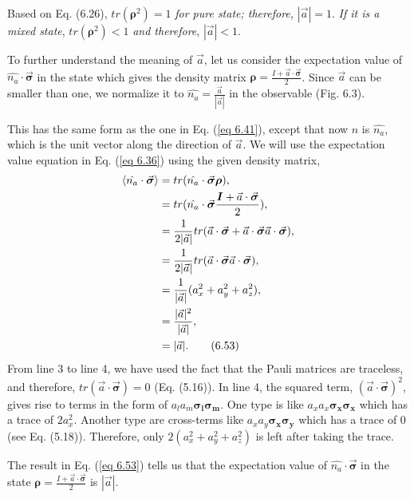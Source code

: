 \documentclass{article}
\begin{document}
Based on Eq. (6.26), $tr(\boldsymbol{\rho}^2)=1$ \textit{for pure state; therefore,} $|\vec{a}|=1$. 
\textit{If it is a mixed state}, $tr(\boldsymbol{\rho}^2)<1$ \textit{and therefore},
$|\vec{a}|<1$.

To further understand the meaning of $\vec{a}$, let us consider the
expectation value of $\hat{n_a}\cdot\vec{\boldsymbol{\sigma}}$ in the
state which gives the density matrix $\boldsymbol{\rho}=\frac{I+\vec{a}\cdot\vec{\boldsymbol{\sigma}}}{2}$.
Since $\vec{a}$ can be smaller than one, we normalize it to 
$\hat{n_a}=\frac{\vec{a}}{|\vec{a}|}$ in the observable (Fig. 6.3).

This has the same form as the one in Eq. (\ref{eq 6.41}), except that now
$\hat{n}$ is $\hat{n_a}$, which is the unit vector along the direction of $\vec{a}$.
We will use the expectation value equation in Eq. (\ref{eq 6.36}) using the given density matrix,
\begin{align*}\label{eq 6.53}
    \braket{\hat{n_a}\cdot\vec{\boldsymbol{\sigma}}}&=tr(\hat{n_a}\cdot\vec{\boldsymbol{\sigma}}\boldsymbol{\rho}),\\
    &=tr(\hat{n_a}\cdot\vec{\boldsymbol{\sigma}}\frac{\boldsymbol{I}+\vec{a}\cdot\vec{\boldsymbol{\sigma}}}{2}),\\
    &=\frac{1}{2|\vec{a}|}tr(\vec{a}\cdot\vec{\boldsymbol{\sigma}}+\vec{a}\cdot\vec{\boldsymbol{\sigma}}\vec{a}\cdot\vec{\boldsymbol{\sigma}}),\\
    &=\frac{1}{2|\vec{a}|}tr(\vec{a}\cdot\vec{\boldsymbol{\sigma}}\vec{a}\cdot\vec{\boldsymbol{\sigma}}),\\
    &=\frac{1}{|\vec{a}|}(a_x^2+a_y^2+a_z^2),\\
    &=\frac{|\vec{a}|^2}{|\vec{a}|},\\
    &=|\vec{a}|. \tag{6.53}
\end{align*}
From line 3 to line 4, we have used the fact that the Pauli matrices are traceless,
and therefore, $tr(\vec{a}\cdot\vec{\boldsymbol{\sigma}})=0$ (Eq. (5.16)). In line 4, 
the squared term, $(\vec{a}\cdot\vec{\boldsymbol{\sigma}})^2$, gives rise to terms
in the form of $a_la_m\boldsymbol{\sigma_l}\boldsymbol{\sigma_m}$. One type is like
$a_xa_x\boldsymbol{\sigma_x}\boldsymbol{\sigma_x}$ which has a trace of $2a_x^2$.
Another type are cross-terms like $a_xa_y\boldsymbol{\sigma_x}\boldsymbol{\sigma_y}$ which
has a trace of 0 (see Eq. (5.18)). Therefore, only $2(a_x^2+a_y^2+a_z^2)$ is left after taking
the trace.

The result in Eq. (\ref{eq 6.53}) tells us that the expectation value of 
$\hat{n_a}\cdot\vec{\boldsymbol{\sigma}}$ in the state $\boldsymbol{\rho}=\frac{I+\vec{a}\cdot\vec{\boldsymbol{\sigma}}}{2}$
is $|\vec{a}|$.
\end{document}
